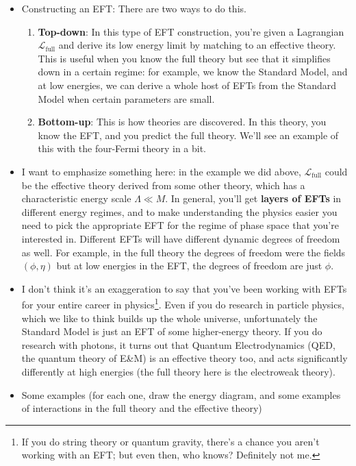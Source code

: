 \documentclass[12pt, oneside]{article}   	%
\theoremstyle{definition}
\begin{document}
\begin{itemize}
	
	\item Constructing an EFT: There are two ways to do this.
	\begin{enumerate}
		\item \textbf{Top-down}: In this type of EFT construction, you're given a Lagrangian $\mathcal L_\mathrm{full}$ and derive its low energy limit by matching to an effective theory. This is useful when you know the full theory but see that it simplifies down in a certain regime: for example, we know the Standard Model, and at low energies, we can derive a whole host of EFTs from the Standard Model when certain parameters are small. 
		\item \textbf{Bottom-up}: This is how theories are discovered. In this theory, you know the EFT, and you predict the full theory. We'll see an example of this with the four-Fermi theory in a bit.
	\end{enumerate}
	
	\item I want to emphasize something here: in the example we did above, $\mathcal L_\mathrm{full}$ could be the effective theory derived from some other theory, which has a characteristic energy scale $\Lambda\ll M$. In general, you'll get \textbf{layers of EFTs} in different energy regimes, and to make understanding the physics easier you need to pick the appropriate EFT for the regime of phase space that you're interested in. Different EFTs will have different dynamic degrees of freedom as well. For example, in the full theory the degrees of freedom were the fields $(\phi, \eta)$ but at low energies in the EFT, the degrees of freedom are just $\phi$.  
	
	\item I don't think it's an exaggeration to say that you've been working with EFTs for your entire career in physics\footnote{If you do string theory or quantum gravity, there's a chance you aren't working with an EFT; but even then, who knows? Definitely not me.}. Even if you do research in particle physics, which we like to think builds up the whole universe, unfortunately the Standard Model is just an EFT of some higher-energy theory. If you do research with photons, it turns out that Quantum Electrodynamics (QED, the quantum theory of E\&M) is an effective theory too, and acts significantly differently at high energies (the full theory here is the electroweak theory). 
	
	\item Some examples (for each one, draw the energy diagram, and some examples of interactions in the full theory and the effective theory)
	\begin{itemize}
	

\end{itemize}
\end{itemize}
\end{document}
